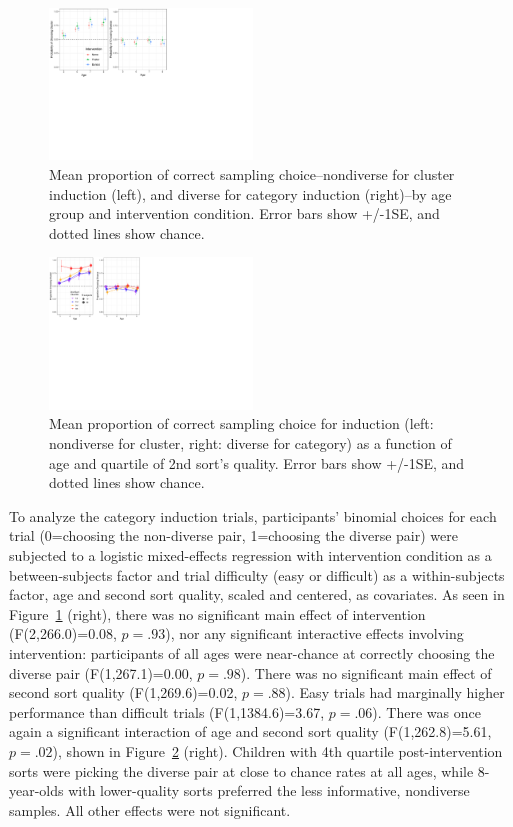\documentclass[10pt,letterpaper]{article}
\begin{document}
\begin{figure}[ht]
  \centering
  \includegraphics[width=0.48\textwidth]{figures/induction_sampling_choices_combo}
  \caption{Mean proportion of correct sampling choice--nondiverse for cluster induction (left), and diverse for category induction (right)--by age group and intervention condition. Error bars show +/-1SE, and dotted lines show chance.}
  \label{fig:sampling-choice}
\end{figure} 
\vspace{-.1cm}
\begin{figure}[ht]
  \centering
  \includegraphics[width=0.48\textwidth]{figures/induction_sampling_age_by_sort2}
  \caption{Mean proportion of correct sampling choice for induction (left: nondiverse for cluster, right: diverse for category) as a function of age and quartile of 2nd sort's quality. Error bars show +/-1SE, and dotted lines show chance.}
  \label{fig:induction-age-by-sort}
\end{figure} 
\vspace{-.1cm}
To analyze the category induction trials, participants' binomial choices for each trial (0=choosing the non-diverse pair, 1=choosing the diverse pair) were subjected to a logistic mixed-effects regression with intervention condition as a between-subjects factor and trial difficulty (easy or difficult) as a within-subjects factor, age and second sort quality, scaled and centered, as covariates.
As seen in Figure~\ref{fig:sampling-choice} (right), there was no significant main effect of intervention (F(2,266.0)=0.08, $p=.93$), nor any significant interactive effects involving intervention: participants of all ages were near-chance at correctly choosing the diverse pair (F(1,267.1)=0.00, $p=.98$).
There was no significant main effect of second sort quality (F(1,269.6)=0.02, $p=.88$).
Easy trials had marginally higher performance than difficult trials (F(1,1384.6)=3.67, $p=.06$). 
There was once again a significant interaction of age and second sort quality (F(1,262.8)=5.61, $p=.02$), shown in Figure~\ref{fig:induction-age-by-sort} (right).
Children with 4th quartile post-intervention sorts were picking the diverse pair at close to chance rates at all ages, while 8-year-olds  with lower-quality sorts preferred the less informative, nondiverse samples. 
All other effects were not significant. 
\end{document}
